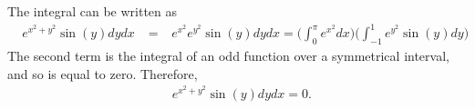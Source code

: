 \item %
The integral can be written as
\begin{align*}
  \mathop{\int_0^{\pi} \!\! \int_{-1}^1} e^{x^2 + y^2}\sin(y) dydx 
  &= \mathop{\int_0^{\pi} \!\! \int_{-1}^1} e^{x^2}e^{y^2}\sin(y) dydx  = \Bigg( \int_0^{\pi} e^{x^2} dx \Bigg)\Bigg( \int_{-1}^1 e^{y^2}\sin(y)dy \Bigg)  
\end{align*}
The second term is the integral of an odd function over a symmetrical interval, and so is equal to zero. Therefore,
\begin{align*}
  \mathop{\int_0^{\pi} \!\! \int_{-1}^1} e^{x^2 + y^2}\sin(y) dydx =0.
\end{align*}

\EEN %
